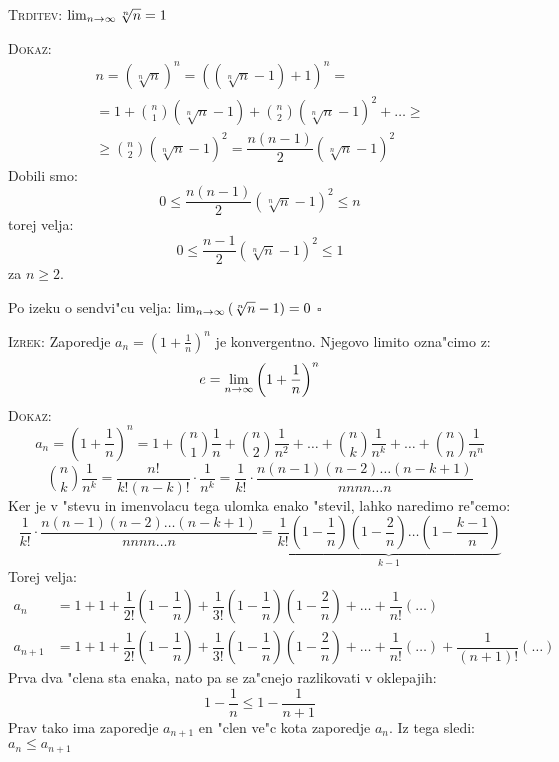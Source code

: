 \textsc{Trditev:} $\lim_{n \rightarrow \infty} \sqrt[n]{n} = 1$

\textsc{Dokaz:} 
\begin{multline*}
n = \left(\sqrt[n]{n}\right)^n = \left(\left(\sqrt[n]{n} - 1\right) + 1\right)^n = \\
= 1 + \binom{n}{1} \left(\sqrt[n]{n} - 1\right) + \binom{n}{2} \left(\sqrt[n]{n} - 1\right)^2 + \ldots \geq \\
\geq \binom{n}{2} \left(\sqrt[n]{n} - 1\right)^2 = \dfrac{n(n-1)}{2} \left(\sqrt[n]{n} - 1\right)^2
\end{multline*}
Dobili smo:
\begin{equation*}
0 \leq \dfrac{n(n-1)}{2} \left(\sqrt[n]{n} - 1\right)^2 \leq n
\end{equation*}
torej velja:
\begin{equation*}
0 \leq \dfrac{n - 1}{2}\left(\sqrt[n]{n} - 1\right)^2 \leq 1
\end{equation*}
za $n \geq 2$.

Po izeku o sendvi"cu velja: $\lim_{n \rightarrow \infty} \left(\sqrt[n]{n} - 1\right) = 0$ \hfill $\square$

\textsc{Izrek:} Zaporedje $a_n = \left(1 + \frac{1}{n}\right)^n$ je konvergentno. Njegovo limito ozna"cimo z:
\begin{equation*}
e = \lim_{n \rightarrow \infty} \left(1 + \dfrac{1}{n}\right)^n
\end{equation*}
\textsc{Dokaz:} 
\begin{equation*}
a_n = \left(1 + \dfrac{1}{n}\right)^n = 1 + \binom{n}{1}\dfrac{1}{n} + \binom{n}{2} \dfrac{1}{n^2} + \ldots + \binom{n}{k}\dfrac{1}{n^k} + \ldots + \binom{n}{n} \dfrac{1}{n^n}
\end{equation*}
\begin{equation*}
\binom{n}{k}\dfrac{1}{n^k} = \dfrac{n!}{k!(n-k)!} \cdot \dfrac{1}{n^k} = \dfrac{1}{k!} \cdot \dfrac{n (n-1) (n-2) \ldots (n - k + 1)}{n n n n \ldots n}
\end{equation*}
Ker je v "stevu in imenvolacu tega ulomka enako "stevil, lahko naredimo re"cemo:
\begin{equation*}
\dfrac{1}{k!} \cdot \dfrac{n (n-1) (n-2) \ldots (n - k + 1)}{n n n n \ldots n} = \underbrace{\dfrac{1}{k!} (1 - \dfrac{1}{n}) (1 - \dfrac{2}{n}) \ldots (1 - \dfrac{k-1}{n})}_{k-1}
\end{equation*}
Torej velja:
\begin{align*}
a_n &= 1 + 1 + \dfrac{1}{2!}(1 - \dfrac{1}{n}) + \dfrac{1}{3!} (1 - \dfrac{1}{n}) (1 - \dfrac{2}{n}) + \ldots + \dfrac{1}{n!}(\ldots) \\
a_{n+1} &= 1 + 1 + \dfrac{1}{2!}(1 - \dfrac{1}{n}) + \dfrac{1}{3!} (1 - \dfrac{1}{n}) (1 - \dfrac{2}{n}) + \ldots + \dfrac{1}{n!}(\ldots) + \dfrac{1}{(n+1)!}(\ldots)
\end{align*}
Prva dva "clena sta enaka, nato pa se za"cnejo razlikovati v oklepajih:
\begin{equation*}
1-\dfrac{1}{n} \leq 1 - \dfrac{1}{n+1}
\end{equation*}
Prav tako ima zaporedje $a_{n+1}$ en "clen ve"c kota zaporedje $a_n$. Iz tega sledi: $a_n \leq a_{n+1}$

